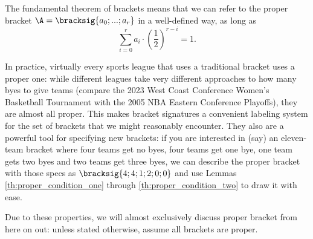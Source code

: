 {    

    The fundamental theorem of brackets means that we can refer to the proper bracket $\A = \bracksig{a_0; ...; a_r}$ in a well-defined way, as long as $$\sum_{i=0}^r a_i \cdot \left(\frac{1}{2}\right)^{r - i} = 1.$$

    In practice, virtually every sports league that uses a traditional bracket uses a proper one: while different leagues take very different approaches to how many byes to give teams (compare the 2023 West Coast Conference Women's Basketball Tournament with the 2005 NBA Eastern Conference Playoffs), they are almost all proper. This makes bracket signatures a convenient labeling system for the set of brackets that we might reasonably encounter. They also are a powerful tool for specifying new brackets: if you are interested in (say) an eleven-team bracket where four teams get no byes, four teams get one bye, one team gets two byes and two teams get three byes, we can describe the proper bracket with those specs as $\bracksig{4; 4; 1; 2; 0; 0}$ and use Lemmas \ref{th:proper_condition_one} through \ref{th:proper_condition_two} to draw it with ease.


    Due to these properties, we will almost exclusively discuss proper bracket from here on out: unless stated otherwise, assume all brackets are proper.
}